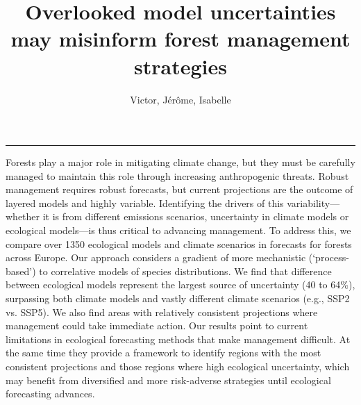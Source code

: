 \documentclass[11pt,letter]{article}
\begin{document}
\title{Overlooked model uncertainties may misinform forest management strategies
}

\author{Victor, Jérôme, Isabelle} %
\date{}
\maketitle 

\noindent\rule{\textwidth}{0.3pt}
Forests play a major role in mitigating climate change, but they must be carefully managed to maintain this role through increasing anthropogenic threats. Robust management requires robust forecasts, but current projections are the outcome of layered models and highly variable. Identifying the drivers of this variability---whether it is from different emissions scenarios, uncertainty in climate models or ecological models---is thus critical to advancing management. To address this, we compare over 1350 ecological models and climate scenarios in forecasts for forests across Europe. Our approach considers a gradient of more mechanistic (`process-based') to correlative models of species distributions. We find that difference between ecological models represent the largest source of uncertainty (40 to 64\%), surpassing both climate models and vastly different climate scenarios (e.g., SSP2 vs. SSP5). We also find areas with relatively consistent projections where management could take immediate action. Our results point to current limitations in ecological forecasting methods that make management difficult. At the same time they provide a framework to identify regions with the most consistent projections and those regions where high ecological uncertainty, which may benefit from diversified and more risk-adverse strategies until ecological forecasting advances.
\end{document}
